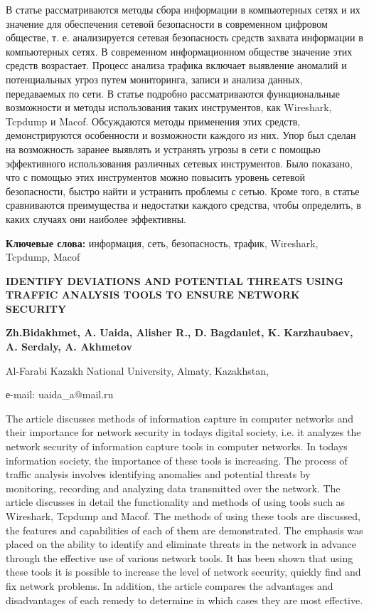 В статье рассматриваются методы сбора информации в компьютерных сетях и
их значение для обеспечения сетевой безопасности в современном цифровом
обществе, т. е. анализируется сетевая безопасность средств захвата
информации в компьютерных сетях. В современном информационном обществе
значение этих средств возрастает. Процесс анализа трафика включает
выявление аномалий и потенциальных угроз путем мониторинга, записи и
анализа данных, передаваемых по сети. В статье подробно рассматриваются
функциональные возможности и методы использования таких инструментов,
как Wireshark, Tcpdump и Macof. Обсуждаются методы применения этих
средств, демонстрируются особенности и возможности каждого из них. Упор
был сделан на возможность заранее выявлять и устранять угрозы в сети с
помощью эффективного использования различных сетевых инструментов. Было
показано, что с помощью этих инструментов можно повысить уровень сетевой
безопасности, быстро найти и устранить проблемы с сетью. Кроме того, в
статье сравниваются преимущества и недостатки каждого средства, чтобы
определить, в каких случаях они наиболее эффективны.

{\bfseries Ключевые слова:} информация, сеть, безопасность, трафик,
Wireshark, Tcpdump, Macof

\begin{center}
{\large\bfseries IDENTIFY DEVIATIONS AND POTENTIAL THREATS USING TRAFFIC
ANALYSIS TOOLS TO ENSURE NETWORK SECURITY}

{\bfseries Zh.Bidakhmet, A. Uaida, Alisher R., D. Bagdaulet, K.
Karzhaubaev, A. Serdaly, A. Akhmetov}

Al-Farabi Kazakh National University, Almaty, Kazakhstan,

е-mail: uaida\_a@mail.ru
\end{center}

The article discusses methods of information capture in computer
networks and their importance for network security in
today\textquotesingle s digital society, i.e. it analyzes the network
security of information capture tools in computer networks. In
today\textquotesingle s information society, the importance of these
tools is increasing. The process of traffic analysis involves
identifying anomalies and potential threats by monitoring, recording and
analyzing data transmitted over the network. The article discusses in
detail the functionality and methods of using tools such as Wireshark,
Tcpdump and Macof. The methods of using these tools are discussed, the
features and capabilities of each of them are demonstrated. The emphasis
was placed on the ability to identify and eliminate threats in the
network in advance through the effective use of various network tools.
It has been shown that using these tools it is possible to increase the
level of network security, quickly find and fix network problems. In
addition, the article compares the advantages and disadvantages of each
remedy to determine in which cases they are most effective.

